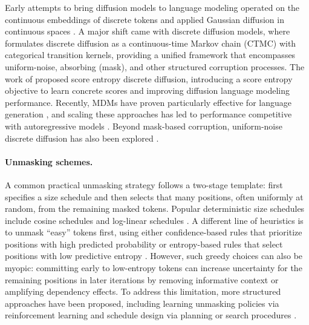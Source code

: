 \documentclass[english]{article}
\begin{document}
Early attempts to bring diffusion models to language modeling operated on the continuous embeddings of discrete tokens and applied Gaussian diffusion in continuous spaces \citep{li2022diffusion}.
A major shift came with discrete diffusion models, where \citet{austin2021structured} formulates discrete diffusion as a continuous-time Markov chain (CTMC) with categorical transition kernels, providing a unified framework that encompasses uniform-noise, absorbing (mask), and other structured corruption processes.
The work of \citet{lou2023discrete} proposed score entropy discrete diffusion, introducing a score entropy objective to learn concrete scores and improving diffusion language modeling performance.
Recently, MDMs have proven particularly effective for language generation \citep{sahoo2024simple,shi2024simplified}, and scaling these approaches has led to performance competitive with autoregressive models \citep{nie2025large,labs2025mercury,song2025seed,you2025llada,zhu2025llada}. Beyond mask-based corruption, uniform-noise discrete diffusion has also been explored \citep{schiff2024simple}.



\paragraph{Unmasking schemes.}
A common practical unmasking strategy follows a two-stage template: first specifies a size schedule and then selects that many positions, often uniformly at random, from the remaining masked tokens. Popular deterministic size schedules include cosine schedules \citep{shi2024simplified} and log-linear schedules \citep{sahoo2024simple,lou2023discrete}.
A different line of heuristics is to unmask ``easy'' tokens first, using either confidence-based rules that prioritize positions with high predicted probability \citep{nie2025large,yu2025dimple,wu2025fast} or entropy-based rules that select positions with low predictive entropy \citep{ben2025accelerated}. 
However, such greedy choices can also be myopic: committing early to low-entropy tokens can increase uncertainty for the remaining positions in later iterations by removing informative context or amplifying dependency effects. To address this limitation, more structured approaches have been proposed, including learning unmasking policies via reinforcement learning \citep{jazbec2025learningunmaskingpoliciesdiffusion} and schedule design via planning or search procedures \citep{fu2025bitsroundsparalleldecoding}. 
\end{document}
